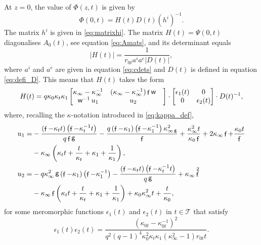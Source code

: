 \documentclass[a4paper,reqno,11pt]{amsart}
\numberwithin{equation}{section}
\numberwithin{figure}{section}
\theoremstyle{plain}
\theoremstyle{remark}
\DeclareMathOperator{\sff}{{\sf f}}
\DeclareMathOperator{\sfg}{{\sf g}}
\DeclareMathOperator{\sfw}{{\sf w}}
\numberwithin{rhp}{section}
\begin{document}
At $z=0$, the value of $\Phi(z,t)$ is given by
\begin{equation}\label{asymp:Psiplus}
    \Phi(0,t)=H(t)D(t)(h^i)^{-1}.
\end{equation}
The matrix $h^i$ is given in \eqref{eq:matrixhi}. The matrix $H(t)=\Psi(0,t)$ diagonalises $A_0(t)$, see equation \eqref{eq:Amats}, and its determinant equals
\begin{equation*}
    |H(t)|=\frac{1}{r_{0t}a^i a^e |D(t)|},
\end{equation*}
where $a^i$ and $a^e$ are given in equation \eqref{eq:cdets} and $D(t)$ is defined in equation \eqref{eq:defi_D}. This means that $H(t)$ takes the form 
\begin{equation*}
 H(t)= q\kappa_0\kappa_t\kappa_1  \begin{bmatrix}
        \kappa_\infty-\kappa_\infty^{-1} &   (\kappa_\infty-\kappa_\infty^{-1})\sff \sfw & \\
       \sfw^{-1}u_1  & u_2
    \end{bmatrix}\cdot \begin{bmatrix}
        \epsilon_1(t) & 0\\
        0 & \epsilon_2(t)
    \end{bmatrix}\cdot D(t)^{-1},
\end{equation*}
where, recalling the $\kappa$-notation introduced in \eqref{eq:kappa_def},
\begin{align*}
    u_1=&-\frac{\left(\sff-\kappa _t t\right)\left(\sff-\kappa_t^{-1}t\right) }{q \sff \sfg }-\frac{ q \left(\sff-\kappa _1\right) \left(\sff-\kappa _1^{-1}\right) \kappa _{\infty \sfg}^2}{\sff }+\frac{ \kappa _{\infty }^2 t}{\kappa _0 \sff }+2\kappa _{\infty } \sff +\frac{\kappa _0 t}{\sff }\\
    &-\kappa_\infty\left( \kappa _t t+\frac{t}{ \kappa _t}+\kappa _1 +\frac{1}{\kappa _1 }\right),\\
    u_2=&-q \kappa _{\infty }^2\sfg \left(\sff-\kappa _1\right)\left(\sff-\kappa_1^{-1}\right)  -\frac{\left(\sff-\kappa _t t\right)\left(\sff-\kappa_t^{-1}t\right)}{q\sfg}+\kappa _{\infty }\sff^2 \\
    &-\kappa _{\infty }\sff  \left( \kappa _t t+\frac{t}{ \kappa _t}+\kappa _1 +\frac{1}{\kappa _1 }\right)+\kappa _0 \kappa _{\infty }^2 t +\frac{t}{\kappa _0},
\end{align*}
for some meromorphic functions $\epsilon_1(t)$ and $\epsilon_2(t)$ in $t\in \mathcal{T}$ that satisfy
\begin{equation}\label{id:epsilon12}
    \epsilon_1(t)\epsilon_2(t)=\frac{  \left(\kappa _{0t}-\kappa _{0t}^{-1}\right)^2}{q^2(q-1)^4\kappa_0^2\kappa_t\kappa_1  \left(\kappa _{\infty }^2-1\right)r_{0t} t}.
\end{equation}
\end{document}
